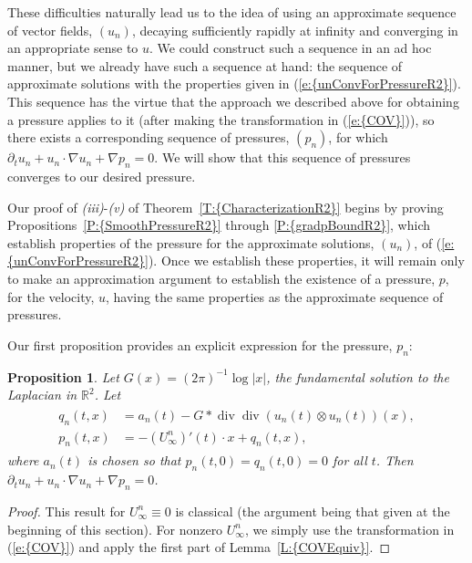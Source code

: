 \documentclass[reqno,openright,11pt,twoside]{amsart}
\newtheorem{prop}[theorem]{Proposition}
\theoremstyle{definition}
\numberwithin{equation}{section}
\begin{document}
These difficulties naturally lead us to the idea of using an approximate sequence of vector fields, $(u_n)$, decaying sufficiently rapidly at infinity and converging in an appropriate sense to $u$. We could construct such a sequence in an ad hoc manner, but we already have such a sequence at hand: the sequence of approximate solutions with the properties given in {(\ref{e:{unConvForPressureR2}})}. This sequence has the virtue that the approach we described above for obtaining a pressure applies to it (after making the transformation in {(\ref{e:{COV}})}), so there exists a corresponding sequence of pressures, $(p_n)$, for which ${\ensuremath{\partial}}_t u_n + u_n \cdot {\ensuremath{\nabla}} u_n + {\ensuremath{\nabla}} p_n = 0$. We will show that this sequence of pressures converges to our desired pressure.

Our proof of {\textit{({iii})}}-{\textit{({v})}} of {Theorem~\ref{T:{CharacterizationR2}}} begins by proving {Propositions~\ref{P:{SmoothPressureR2}} through \ref{P:{gradpBoundR2}}}, which establish properties of the pressure for the approximate solutions, $(u_n)$, of {(\ref{e:{unConvForPressureR2}})}. Once we establish these properties, it will remain only to make an approximation argument to establish the existence of a pressure, $p$, for the velocity, $u$, having the same properties as the approximate sequence of pressures.

Our first proposition provides an explicit expression for the pressure, $p_n$:
\begin{prop}\label{P:SmoothPressureR2}
    Let $G(x) = (2 \pi)^{-1} \log {\left\vert{x}\right\vert}$, the fundamental solution to
    the Laplacian in ${\ensuremath{{\ensuremath{\mathbb{{R}}}}}}^2$. Let
    \begin{align}\label{e:pqnR2}
	     \begin{split}
			    q_n(t, x)
				    &= a_n(t)
				        - G*\operatorname{div} \operatorname{div} (u_n(t) \otimes u_n(t))(x), \\
			    p_n(t, x)
				    &= -(U_{\ensuremath{\infty}}^n)'(t) \cdot x
					        + q_n(t, x),
	    \end{split}
    \end{align}
where $a_n(t)$ is chosen so that $p_n(t, 0) = q_n(t, 0) = 0$ for all $t$. Then ${\ensuremath{\partial}}_t u_n + u_n \cdot {\ensuremath{\nabla}} u_n + {\ensuremath{\nabla}} p_n = 0$.
\end{prop}
\begin{proof}
    This result for $U_{\ensuremath{\infty}}^n \equiv 0$ is classical (the argument being that given at the
    beginning of this section). For nonzero $U_{\ensuremath{\infty}}^n$, we simply use the transformation
    in {(\ref{e:{COV}})} and apply the first part of {Lemma~\ref{L:{COVEquiv}}}.
    
\end{proof}
\end{document}
